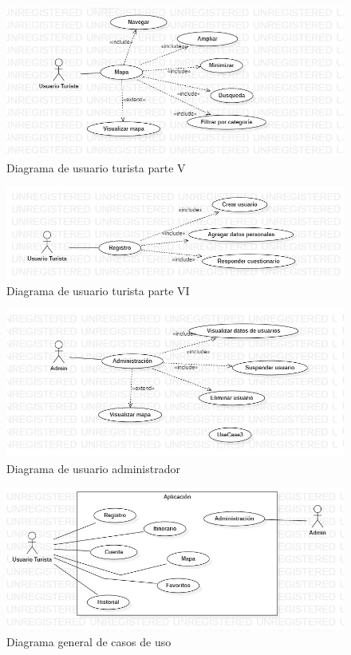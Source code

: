     \begin{figure}[htb]
        \centering
        \includegraphics[width= 15cm]{img5.jpg}
        \caption{Diagrama de usuario turista parte V}
        \label{fig:enter-label}
    \end{figure}
    \begin{figure}[htb]
        \centering
        \includegraphics[width= 15cm]{img6.jpg}
        \caption{Diagrama de usuario turista parte VI}
        \label{fig:enter-label}
    \end{figure}
    \begin{figure}[htb]
        \centering
        \includegraphics[width= 15cm]{im2.jpg}
        \caption{Diagrama de usuario administrador}
        \label{fig:enter-label}
    \end{figure}
    \begin{figure}[htb]
        \centering
        \includegraphics[width= 15cm]{img7.jpg}
        \caption{Diagrama general de casos de uso}
        \label{fig:enter-label}
    \end{figure}